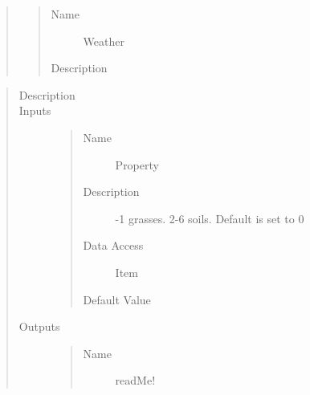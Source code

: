 \documentclass[letterpaper,10pt,english]{sphinxmanual}
\begin{document}
\begin{quote}
\begin{description}
\begin{quote}
\begin{description}
\item[{Name}] \leavevmode
Weather

\item[{Description}] \leavevmode
{}

\end{description}\end{quote}

\end{description}\end{quote}

\begin{quote}\begin{description}
\item[{Description}] \leavevmode
{}

\item[{Inputs}] \leavevmode\begin{quote}\begin{description}
\item[{Name}] \leavevmode
Property

\item[{Description}] -1 grasses. 2-6 soils. Default is set to 0

\item[{Data Access}] \leavevmode
Item

\item[{Default Value}] \leavevmode
{}

\end{description}\end{quote}

\item[{Outputs}] \leavevmode\begin{quote}\begin{description}
\item[{Name}] \leavevmode
readMe!


\end{description}
\end{quote}
\end{description}
\end{quote}
\end{document}
